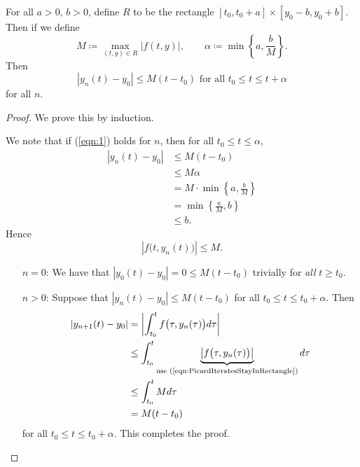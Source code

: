 \documentclass{article}
\begin{document}
\begin{lemma}
    For all $a > 0$, $b > 0$, define $R$ to be the rectangle $[t_0, t_0 + a] \times [y_0-b,y_0+b]$.
    Then if we define
    \[
        M
        \coloneq
        \max_{(t,y) \in R}
        |f(t,y)|, \qquad
        \alpha
        \coloneq
        \min\left\{a,\frac{b}{M}\right\}.
    \]
    Then 
    \begin{equation}
        \label{eqn:1}
        |y_n(t)-y_0| \leq M(t-t_0)
        \text{ for all }
        t_0 \leq t \leq t + \alpha
    \end{equation}
    for all $n$.
\end{lemma}
\begin{proof}
    We prove this by induction.

    We note that if (\ref{eqn:1}) holds for $n$, then for all $t_0 \leq t \leq \alpha$,
    \begin{align*}
        |y_n(t) - y_0| 
        &\leq 
        M(t-t_0) \\
        &\leq 
        M\alpha \\
        &=
        M \cdot \min\left\{a, \frac{b}{M}\right\} \\
        &=
        \min\left\{\frac{a}{M}, b\right\} \\
        &\leq 
        b.
    \end{align*}
    Hence
    \begin{equation}
        \label{eqn:PicardIteratesStayInRectangle}
        |f\big(t, y_n(t)\big)| \leq M.
    \end{equation}

    \begin{itemize}
        \item[$n=0$:]
            We have that $|y_0(t) - y_0| = 0 \leq M(t-t_0)$ trivially for \textit{all} $t \geq t_0$.
        \item[$n > 0$:]
            Suppose that $|y_n(t) - y_0| \leq M(t-t_0)$ for all $t_0 \leq t \leq t_0 + \alpha$.
            Then
            \begin{align*}
                |y_{n+1}(t)-y_0|
                &=
                \left\lvert
                    \int_{t_0}^t
                    f\big(\tau, y_n(\tau)\big)
                    d\tau
                \right\rvert
                \\
                &\leq
                \int_{t_0}^t
                \underbrace{
                    \left\lvert
                        f\big(\tau, y_n(\tau)\big)
                    \right\rvert
                }_{\text{use (\ref{eqn:PicardIteratesStayInRectangle})}}
                d\tau
                \\
                &\leq
                \int_{t_0}^t
                M
                d\tau
                \\
                &=
                M(t-t_0)
            \end{align*}
            for all $t_0 \leq t \leq t_0 + \alpha$.
            This completes the proof.
    \end{itemize}
\end{proof}
\end{document}
